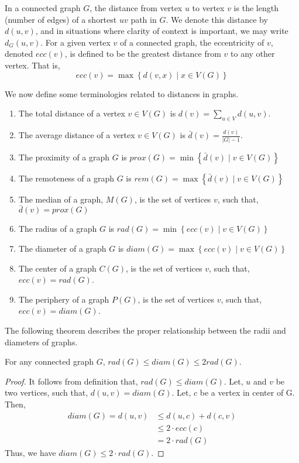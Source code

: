 \documentclass[../basic_graph_theory.tex]{subfiles}
\begin{document}
In a connected graph $G$, the distance from vertex $u$ to vertex $v$ is the length (number of edges) of a shortest $uv$ path in $G$. We denote this distance by $d(u,v)$, and in situations where clarity of context is important, we may write $d_G(u,v)$.
For a given vertex $v$ of a connected graph, the eccentricity of $v$, denoted $ecc(v)$, is defined to be the greatest distance from $v$ to any other vertex. That is,\\
\[
    ecc(v) = \max \left\{ d(v,x) \mid x \in V(G) \right\}
\]

We now define some terminologies related to distances in graphs.
\begin{enumerate}
    \item The total distance of a vertex $v \in V(G)$ is $d(v)=\sum_{u \in V} d(u,v)$.
    \item The average distance of a vertex $v \in V(G)$ is $\bar{d}(v)=\frac{d(v)}{|G|-1}$.
    \item The proximity of a graph $G$ is $prox(G) = \min \left\{\bar{d}(v) \mid v \in V(G) \right\}$
    \item The remoteness of a graph $G$ is $rem(G) = \max \left\{\bar{d}(v) \mid v \in V(G) \right\}$
    \item The median of a graph, $M(G)$, is the set of vertices $v$, such that, $\bar{d}(v)=prox(G)$
    \item The radius of a graph $G$ is $rad(G) = \min \left\{ ecc(v) \mid v \in V(G) \right\}$
    \item The diameter of a graph $G$ is $diam(G) = \max \left\{ ecc(v) \mid v \in V(G) \right\}$
    \item The center of a graph $C(G)$, is the set of vertices $v$, such that, $ecc(v)=rad(G)$.
    \item The periphery of a graph $P(G)$, is the set of vertices $v$, such that, $ecc(v)=diam(G)$.
\end{enumerate}

The following theorem describes the proper relationship between the radii and
diameters of graphs.

\begin{Thm}{}{}
    For any connected graph $G$, $rad(G) \le diam(G) \le 2rad(G)$.
\end{Thm}{}{}
\begin{proof}
    It follows from definition that, $rad(G) \le diam(G)$. Let, $u$ and $v$ be two vertices, such that, $d(u,v)=diam(G)$. Let, $c$ be a vertex in center of G. Then,
    \begin{align*}
        diam(G) = d(u,v)
         & \le d(u,c)+d(c,v) \\
         & \le 2\cdot ecc(c) \\
         & = 2\cdot rad(G)
    \end{align*}
    Thus, we have $diam(G) \le 2\cdot rad(G)$.
\end{proof}
\end{document}
